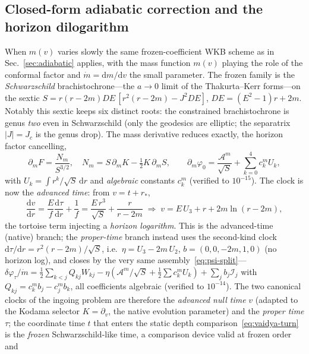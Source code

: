 \documentclass[12pt]{iopart}
\newcommand{\Jc}{J_{c}}
\newcommand{\dd}{\mathrm{d}}
\begin{document}
\subsection{Closed-form adiabatic correction and the horizon dilogarithm}
\label{sec:vaidya-adiabatic}
When $m(v)$ varies slowly the same frozen-coefficient WKB scheme as in
Sec.~\ref{sec:adiabatic} applies, with the mass function $m(v)$ playing the role of
the conformal factor and $\dot m=\dd m/\dd v$ the small parameter. The frozen family
is the \emph{Schwarzschild} brachistochrone---the $a\to0$ limit of the
Thakurta--Kerr forms---on the sextic
$S=r(r-2m)DE\,[r^2(r-2m)-J^2 DE]$, $DE=(E^2-1)r+2m$. Notably this sextic keeps six
distinct roots: the constrained brachistochrone is genus \emph{two} even in
Schwarzschild (only the geodesics are elliptic; the separatrix $|J|=\Jc$ is the
genus drop). The mass derivative reduces exactly, the horizon factor cancelling,
\begin{equation}
    \partial_m F=\frac{N_m}{S^{3/2}},\quad N_m=S\,\partial_m K-\tfrac12 K\,\partial_m S,
    \qquad
    \partial_m\varphi_0=\frac{\mathcal{A}^m}{\sqrt S}+\sum_{k=0}^4 c_k^m U_k,
    \label{eq:dm-reduction}
\end{equation}
with $U_k=\int r^k/\sqrt S\,\dd r$ and \emph{algebraic} constants $c_k^m$ (verified
to $10^{-15}$). The clock is now the \emph{advanced time}: from $v=t+r_*$,
\begin{equation}
    \frac{\dd v}{\dd r}=\frac{E}{f}\frac{\dd\tau}{\dd r}+\frac1f
    =\frac{E\,r^3}{\sqrt S}+\frac{r}{r-2m}
    \;\Rightarrow\;
    v=E\,U_3+r+2m\ln(r-2m),
    \label{eq:vaidya-clock}
\end{equation}
the tortoise term injecting a \emph{horizon logarithm}. This is the advanced-time
(native) branch; the \emph{proper-time} branch instead uses the second-kind clock
$\dd\tau/\dd r=r^2(r-2m)/\sqrt S$, i.e.\ $\eta=U_3-2m\,U_2$, $b=(0,0,-2m,1,0)$ (no
horizon log), and closes by the very same
assembly~\eqref{eq:psi-split}---$\delta\varphi_\tau/\dot m=\tfrac12\sum_{k<j}Q_{kj}
W_{kj}-\eta(\mathcal{A}^m/\sqrt S+\tfrac12\sum c_k^m U_k)+\sum_j b_j\mathcal{I}_j$ with
$Q_{kj}=c_k^m b_j-c_j^m b_k$, all coefficients algebraic (verified to
$10^{-14}$). The two canonical clocks of the ingoing problem are therefore the
\emph{advanced null time} $v$ (adapted to the Kodama selector $K=\partial_v$, the
native evolution parameter) and the \emph{proper time} $\tau$; the coordinate time
$t$ that enters the static depth comparison~\eqref{eq:vaidya-turn} is the
\emph{frozen} Schwarzschild-like time, a comparison device valid at frozen order and
\end{document}
